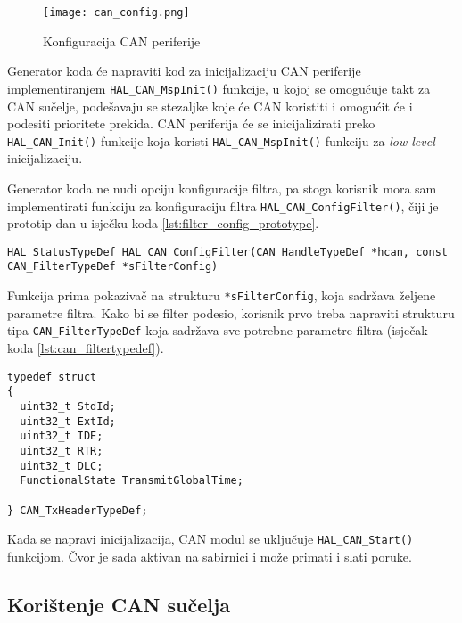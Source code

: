\begin{figure}[H]
	\centering
	\texttt{[image: can\_config.png]}
	\caption{Konfiguracija CAN periferije}
	\label{fig:can_config}
\end{figure}

\noindent Generator koda će napraviti kod za inicijalizaciju CAN periferije implementiranjem \verb|HAL_CAN_MspInit()| funkcije, u kojoj se omogućuje takt za CAN sučelje, podešavaju se stezaljke koje će CAN koristiti i omogućit će i podesiti prioritete prekida. CAN periferija će se inicijalizirati preko \verb|HAL_CAN_Init()| funkcije koja koristi \verb|HAL_CAN_MspInit()| funkciju za \textit{low-level} inicijalizaciju.

Generator koda ne nudi opciju konfiguracije filtra, pa stoga korisnik mora sam implementirati funkciju za konfiguraciju filtra \verb|HAL_CAN_ConfigFilter()|, čiji je prototip dan u isječku koda \ref{lst:filter_config_prototype}.

\begin{lstlisting}[caption=Prototip funkcije \texttt{HAL\_CAN\_ConfigFilter()}, label={lst:filter_config_prototype}]
HAL_StatusTypeDef HAL_CAN_ConfigFilter(CAN_HandleTypeDef *hcan, const CAN_FilterTypeDef *sFilterConfig)
\end{lstlisting} 

\noindent Funkcija prima pokazivač na strukturu \verb|*sFilterConfig|, koja sadržava željene parametre filtra. Kako bi se filter podesio, korisnik prvo treba napraviti strukturu tipa \verb|CAN_FilterTypeDef| koja sadržava sve potrebne parametre filtra (isječak koda \ref{lst:can_filtertypedef}).

\begin{lstlisting}[caption=\texttt{CAN\_FilterTypeDef} struktura, label={lst:can_filtertypedef}]
typedef struct
{
  uint32_t StdId;
  uint32_t ExtId;
  uint32_t IDE;
  uint32_t RTR;
  uint32_t DLC;
  FunctionalState TransmitGlobalTime;

} CAN_TxHeaderTypeDef;
\end{lstlisting}

\noindent Kada se napravi inicijalizacija, CAN modul se uključuje \verb|HAL_CAN_Start()| funkcijom. Čvor je sada aktivan na sabirnici i može primati i slati poruke.

\subsection{Korištenje CAN sučelja}

